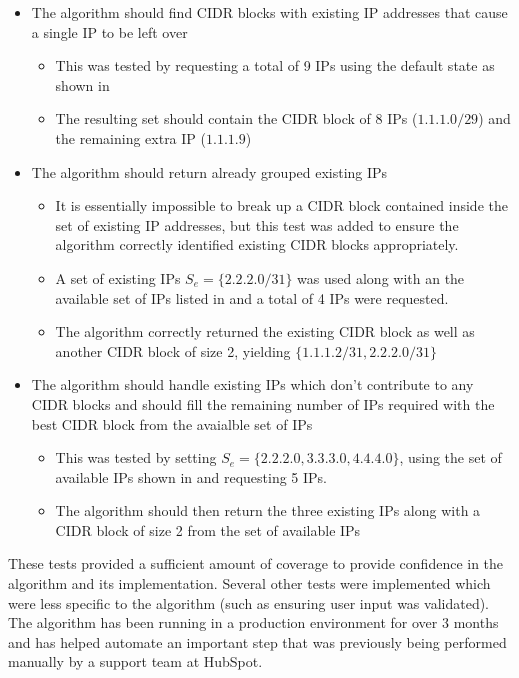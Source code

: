 \begin{itemize}
\begin{itemize}
      \end{itemize}
\item{The algorithm should find CIDR blocks with existing IP addresses that cause a single IP to be left over}
      \begin{itemize}
      \item{This was tested by requesting a total of 9 IPs using the default state as shown in }
      \item{The resulting set should contain the CIDR block of 8 IPs ($1.1.1.0/29$) and the remaining extra IP ($1.1.1.9$)}
      \end{itemize}
\item{The algorithm should return already grouped existing IPs}
      \begin{itemize}
      \item{It is essentially impossible to break up a CIDR block contained inside the set of existing IP addresses, but this test was added to ensure the algorithm correctly identified existing CIDR blocks appropriately.}
      \item{A set of existing IPs $S_e = \{2.2.2.0/31\}$ was used along with an the available set of IPs listed in  and a total of 4 IPs were requested.}
      \item{The algorithm correctly returned the existing CIDR block as well as another CIDR block of size 2, yielding $\{1.1.1.2/31, 2.2.2.0/31\}$}
      \end{itemize}
\item{The algorithm should handle existing IPs which don't contribute to any CIDR blocks and should fill the remaining number of IPs required with the best CIDR block from the avaialble set of IPs}
      \begin{itemize}
      \item{This was tested by setting $S_e = \{2.2.2.0, 3.3.3.0, 4.4.4.0\}$}, using the set of available IPs shown in  and requesting 5 IPs.
      \item{The algorithm should then return the three existing IPs along with a CIDR block of size 2 from the set of available IPs}
      \end{itemize}
\end{itemize}

These tests provided a sufficient amount of coverage to provide confidence in the algorithm and its implementation. Several other tests were implemented which were less specific to the algorithm (such as ensuring user input was validated). The algorithm has been running in a production environment for over 3 months and has helped automate an important step that was previously being performed manually by a support team at HubSpot.   